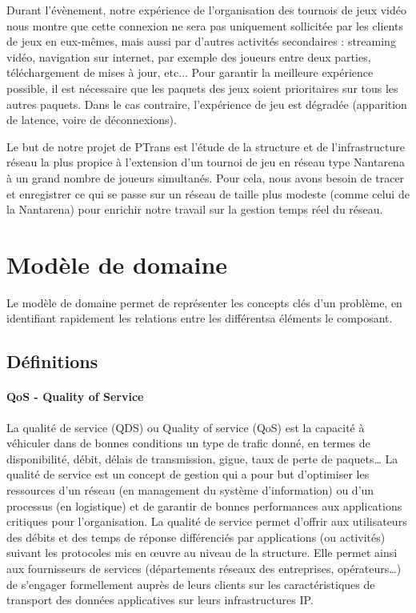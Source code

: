 \documentclass[french]{article}
\begin{document}
Durant l'évènement, notre expérience de l'organisation des tournois de jeux vidéo nous montre que cette connexion ne sera pas uniquement sollicitée par les clients de jeux en eux-mêmes, mais aussi par d'autres activités secondaires : streaming vidéo, navigation sur internet, par exemple des joueurs entre deux parties, téléchargement de mises à jour, etc...
Pour garantir la meilleure expérience possible, il est nécessaire que les paquets des jeux soient prioritaires sur tous les autres paquets. Dans le cas contraire, l'expérience de jeu est dégradée (apparition de latence, voire de déconnexions).

Le but de notre projet de PTrans est l'étude de la structure et de l'infrastructure réseau la plus propice à l'extension d'un tournoi de jeu en réseau type Nantarena à un grand nombre de joueurs simultanés.
Pour cela, nous avons besoin de tracer et enregistrer ce qui se passe sur un réseau de taille plus modeste (comme celui de la Nantarena) pour enrichir notre travail sur la gestion temps réel du réseau.

\section{Modèle de domaine}

Le modèle de domaine permet de représenter les concepts clés d'un problème, en identifiant rapidement les relations entre les différentsa éléments le composant.

\subsection{Définitions}
\paragraph{QoS - Quality of Service}

La qualité de service (QDS) ou Quality of service (QoS) est la capacité à véhiculer dans de bonnes conditions un type de trafic donné, en termes de disponibilité, débit, délais de transmission, gigue, taux de perte de paquets…
La qualité de service est un concept de gestion qui a pour but d’optimiser les ressources d'un réseau (en management du système d'information) ou d'un processus (en logistique) et de garantir de bonnes performances aux applications critiques pour l'organisation. La qualité de service permet d’offrir aux utilisateurs des débits et des temps de réponse différenciés par applications (ou activités) suivant les protocoles mis en œuvre au niveau de la structure.
Elle permet ainsi aux fournisseurs de services (départements réseaux des entreprises, opérateurs…) de s’engager formellement auprès de leurs clients sur les caractéristiques de transport des données applicatives sur leurs infrastructures IP.
\end{document}

